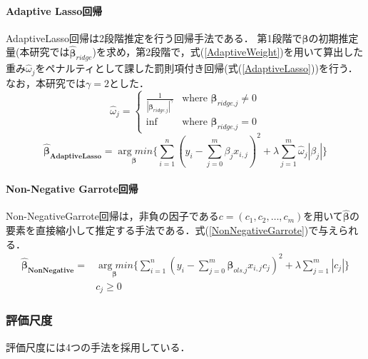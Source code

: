 \paragraph{Adaptive Lasso回帰 \quad \\}
AdaptiveLasso回帰\cite{Zou2006}\cite{Araki2013}は2段階推定を行う回帰手法である．
第1段階で$\bm{\beta}$の初期推定量(本研究では$\bm{\hat{\beta}}_{ridge}$)を求め，第2段階で，式(\ref{AdaptiveWeight})を用いて算出した重み$\hat{\omega}_{j}$をペナルティとして課した罰則項付き回帰(式(\ref{AdaptiveLasso}))を行う．
なお，本研究では$\gamma=2$とした．
\begin{equation}
  \label{AdaptiveWeight}
  \hat{\omega}_{j}= 
  \begin{cases} 
  \frac{1}{|\bm{\beta}_{ridge.j}|^\gamma} & \text{where } \bm{\beta}_{ridge.j} \neq 0\\
  \inf & \text{where } \bm{\beta}_{ridge.j} = 0
  \end{cases}
\end{equation}
\begin{equation}
  \label{AdaptiveLasso}
  \bm{\hat{\beta}_{AdaptiveLasso}} =
\underset{\bm{\beta}}{\arg min}\lbrace\sum_{i=1}^{n}(y_{i} -\sum_{j=0}^{m}\beta_{j}x_{i,j})^2 +\lambda\sum_{j=1}^{m}\hat\omega_{j}|\beta_{j}|\rbrace
\end{equation}

\paragraph{Non-Negative Garrote回帰 \quad \\}
Non-NegativeGarrote回帰\cite{Zou2006}\cite{Araki2013}は，非負の因子である$c=(c_{1}, c_{2},\dots,c_m)$を用いて$\bm{\hat{\beta}}$の要素を直接縮小して推定する手法である．式(\ref{NonNegativeGarrote})で与えられる．
\begin{equation}
  \label{NonNegativeGarrote}
  \begin{split} 
  \bm{\hat{\beta}_{NonNegative}} =
  &\underset{\bm{\beta}}{\arg min}\lbrace\sum_{i=1}^{n}(y_{i} -\sum_{j=0}^{m}\bm{\beta}_{ols.j}x_{i,j}c_{j})^2 +\lambda\sum_{j=1}^{m}|c_{j}|\rbrace\\
  &c_{j}\geq0
  \end{split} 
\end{equation}

\subsubsection{評価尺度}\label{Evaluation}
評価尺度には4つの手法を採用している．

